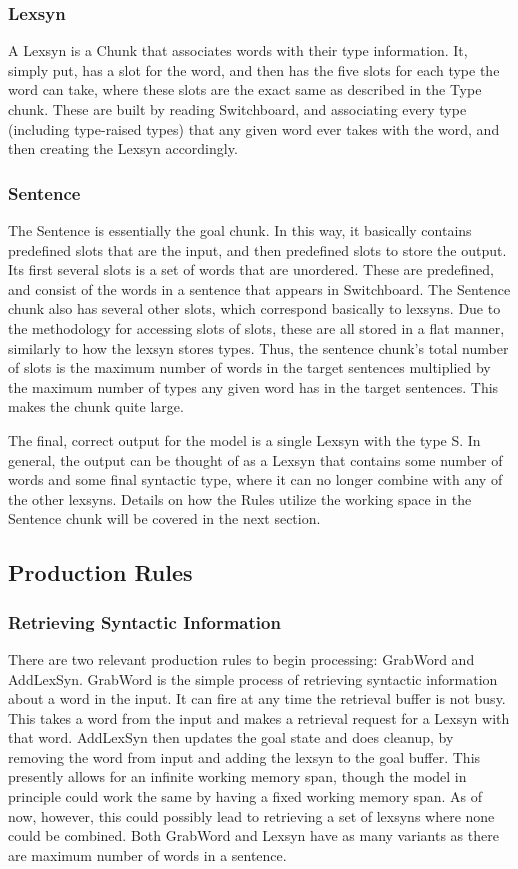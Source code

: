 \subsubsection{Lexsyn}
A Lexsyn is a Chunk that associates words with their type information. It, simply put, has a slot for the word, and then has the five slots for each type the word can take, where these slots are the exact same as described in the Type chunk. These are built by reading Switchboard, and associating every type (including type-raised types) that any given word ever takes with the word, and then creating the Lexsyn accordingly.  

\subsubsection{Sentence}
The Sentence is essentially the goal chunk. In this way, it basically contains predefined slots that are the input, and then predefined slots to store the output. Its first several slots is a set of words that are unordered. These are predefined, and consist of the words in a sentence that appears in Switchboard. The Sentence chunk also has several other slots, which correspond basically to lexsyns. Due to the methodology for accessing slots of slots, these are all stored in a flat manner, similarly to how the lexsyn stores types. Thus, the sentence chunk's total number of slots is the maximum number of words in the target sentences multiplied by the maximum number of types any given word has in the target sentences. This makes the chunk quite large. 

The final, correct output for the model is a single Lexsyn with the type S. In general, the output can be thought of as a Lexsyn that contains some number of words and some final syntactic type, where it can no longer combine with any of the other lexsyns. Details on how the Rules utilize the working space in the Sentence chunk will be covered in the next section. 

\subsection{Production Rules}
\subsubsection{Retrieving Syntactic Information}
There are two relevant production rules to begin processing: GrabWord and AddLexSyn. GrabWord is the simple process of retrieving syntactic information about a word in the input. It can fire at any time the retrieval buffer is not busy. This takes a word from the input and makes a retrieval request for a Lexsyn with that word. AddLexSyn then updates the goal state and does cleanup, by removing the word from input and adding the lexsyn to the goal buffer. This presently allows for an infinite working memory span, though the model in principle could work the same by having a fixed working memory span. As of now, however, this could possibly lead to retrieving a set of lexsyns where none could be combined. Both GrabWord and Lexsyn have as many variants as there are maximum number of words in a sentence. 

